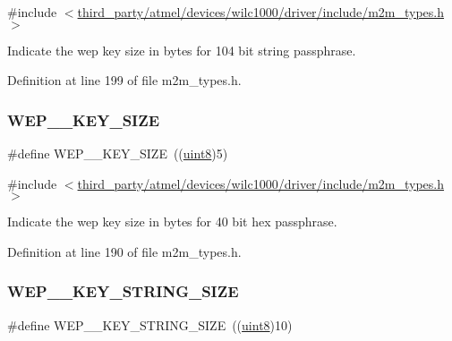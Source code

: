 {\ttfamily \#include $<$\hyperlink{m2m__types_8h}{third\+\_\+party/atmel/devices/wilc1000/driver/include/m2m\+\_\+types.\+h}$>$}

Indicate the wep key size in bytes for 104 bit string passphrase. 

Definition at line 199 of file m2m\+\_\+types.\+h.

\mbox{\label{group__WlanDefines_ga7d5baa02b3f329278043baf0535daa50}} 
\subsubsection{\texorpdfstring{W\+E\+P\+\_\+\_\+\+K\+E\+Y\+\_\+\+S\+I\+ZE}{WEP\_40\_KEY\_SIZE}}
{\footnotesize\ttfamily \#define W\+E\+P\+\_\+\_\+\+K\+E\+Y\+\_\+\+S\+I\+ZE~((\hyperlink{group__DataT_ga4df709a77647e870bbf1d955b8edc9a6}{uint8})5)}



{\ttfamily \#include $<$\hyperlink{m2m__types_8h}{third\+\_\+party/atmel/devices/wilc1000/driver/include/m2m\+\_\+types.\+h}$>$}

Indicate the wep key size in bytes for 40 bit hex passphrase. 

Definition at line 190 of file m2m\+\_\+types.\+h.

\mbox{\label{group__WlanDefines_ga4cfa81969980f3edea139634eeeb7ee1}} 
\subsubsection{\texorpdfstring{W\+E\+P\+\_\+\_\+\+K\+E\+Y\+\_\+\+S\+T\+R\+I\+N\+G\+\_\+\+S\+I\+ZE}{WEP\_40\_KEY\_STRING\_SIZE}}
{\footnotesize\ttfamily \#define W\+E\+P\+\_\+\_\+\+K\+E\+Y\+\_\+\+S\+T\+R\+I\+N\+G\+\_\+\+S\+I\+ZE~((\hyperlink{group__DataT_ga4df709a77647e870bbf1d955b8edc9a6}{uint8})10)}



